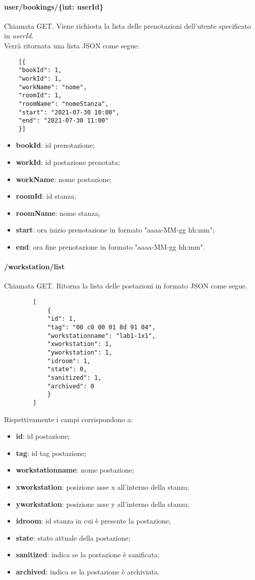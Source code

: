 \paragraph{user/bookings/\{int: userId\}}
Chiamata GET. Viene richiesta la lista delle prenotazioni dell'utente specificato in \textit{userId}.\\
Verrà ritornata una lista JSON come segue:
\begin{center}
	\begin{lstlisting}
	[{
	"bookId": 1,
	"workId": 1,
	"workName": "nome",
	"roomId": 1,
	"roomName": "nomeStanza",
	"start": "2021-07-30 10:00",
	"end": "2021-07-30 11:00"
	}]
	\end{lstlisting}
\end{center}
\begin{itemize}
	\item \textbf{bookId}: id prenotazione;
	\item \textbf{workId}: id postazione prenotata;
	\item \textbf{workName}: nome postazione;
	\item \textbf{roomId}: id stanza;
	\item \textbf{roomName}: nome stanza;	
	\item \textbf{start}: ora inizio prenotazione in formato "aaaa-MM-gg hh:mm";	
	\item \textbf{end}: ora fine prenotazione in formato "aaaa-MM-gg hh:mm".
\end{itemize}

\paragraph{/workstation/list}
Chiamata GET. Ritorna la lista delle postazioni in formato JSON come segue.	\\
\begin{center}
	\begin{lstlisting}
		[
			{
			"id": 1, 
			"tag": "00 c0 00 01 8d 91 04",
			"workstationname": "lab1-1x1",
			"xworkstation": 1, 
			"yworkstation": 1, 
			"idroom": 1,
			"state": 0,
			"sanitized": 1,
			"archived": 0
			}
		]
	\end{lstlisting}
\end{center}
Rispettivamente i campi corrispondono a:
\begin{itemize}
	\item \textbf{id}: id postazione;
	\item \textbf{tag}: id tag postazione;
	\item \textbf{workstationname}: nome postazione;
	\item \textbf{xworkstation}: posizione asse x all'interno della stanza;
	\item \textbf{yworkstation}: posizione asse y all'interno della stanza;	
	\item \textbf{idroom}: id stanza in cui è presente la postazione;	
	\item \textbf{state}: stato attuale della postazione;	
	\item \textbf{sanitized}: indica se la postazione è sanificata;	
	\item \textbf{archived}: indica se la postazione è archiviata.	
\end{itemize}
